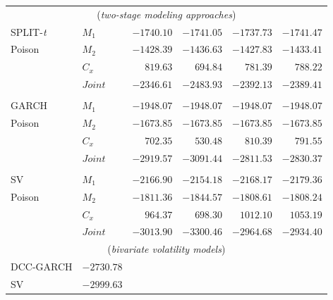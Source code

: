 \documentclass{beamer}
\begin{document}
\begin{frame}
{\begin{tabular}{llrrrr}
            \multicolumn{6}{c}{(\emph{two-stage modeling approaches})}\\


            SPLIT-\emph{t} &  $M_1$  &    $-1740.10$      &   $-1741.05$       &   $-1737.73$      &     $-1741.47$              \\
            Poison         &  $M_2$  &     $-1428.39$    &     $-1436.63$     &    $-1427.83$     &      $-1433.41$               \\
                                                       &  $C_x$   &     $819.63$       &   $694.84$       &  $781.39$       &       $788.22$              \\
                                                       &  $Joint$   &    $\mathbf{-2346.61}$       &    $-2483.93$     &   $-2392.13$     &   $-2389.41$                \\

            \\
            GARCH          &  $M_1$   &     $-1948.07$       &  $-1948.07$        &  $-1948.07$    &     $-1948.07$                \\
            Poison            &  $M_2$   &     $-1673.85$       &  $-1673.85$        &  $-1673.85$     &    $-1673.85$                 \\
                                                       &  $C_x$   &     $702.35$       &    $530.48$      &   $810.39$      &        $791.55$               \\
                                                       &  $Joint$   &     $-2919.57$       &   $$-3091.44$$       &  $-2811.53$   &     $-2830.37$                \\
            \\
            SV             &  $M_1$   &     $-2166.90$       &  $-2154.18$        &   $-2168.17$      &         $-2179.36$            \\
            Poison               &  $M_2$   &     $-1811.36$       &   $-1844.57$       &  $-1808.61$      &     $-1808.24$              \\
                                                       &  $C_x$   &     $964.37$      &   $698.30$     &   $1012.10$      &      $1053.19$               \\
                                                       &  $Joint$   &     $-3013.90$       &     $-3300.46$     &  $-2964.68$  &    $-2934.40$               \\
            \midrule
            \multicolumn{6}{c}{(\emph{bivariate volatility models})}\\
            DCC-GARCH &  $-2730.78$ & \\
            SV &  $-2999.63$ & \\

            \bottomrule
          \end{tabular}
        }
\end{frame}
\end{document}
